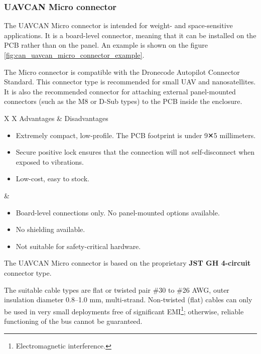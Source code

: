 \clearpage  %
\subsubsection{UAVCAN Micro connector}

The UAVCAN Micro connector is intended for weight- and space-sensitive applications.
It is a board-level connector, meaning that it can be installed on the PCB rather than on the panel.
An example is shown on the figure \ref{fig:can_uavcan_micro_connector_example}.

The Micro connector is compatible with the Dronecode Autopilot Connector Standard.
This connector type is recommended for small UAV and nanosatellites.
It is also the recommended connector for attaching external panel-mounted connectors
(such as the M8 or D-Sub types) to the PCB inside the enclosure.

{
\NoLeftSkip
\begin{UAVCANCompactTable}{X X}
    Advantages & Disadvantages \\
    \begin{itemize}
        \item Extremely compact, low-profile. The PCB footprint is under 9✕5 millimeters.
        \item Secure positive lock ensures that the connection will not self-disconnect when exposed to vibrations.
        \item Low-cost, easy to stock.
    \end{itemize}
    &
    \begin{itemize}
        \item Board-level connections only. No panel-mounted options available.
        \item No shielding available.
        \item Not suitable for safety-critical hardware.
    \end{itemize}
\end{UAVCANCompactTable}
}

The UAVCAN Micro connector is based on the proprietary \textbf{JST GH 4-circuit} connector type.

The suitable cable types are flat or twisted pair \#30 to \#26 AWG,
outer insulation diameter 0.8--1.0 mm, multi-strand.
Non-twisted (flat) cables can only be used in very small deployments free of significant
EMI\footnote{Electromagnetic interference.};
otherwise, reliable functioning of the bus cannot be guaranteed.


